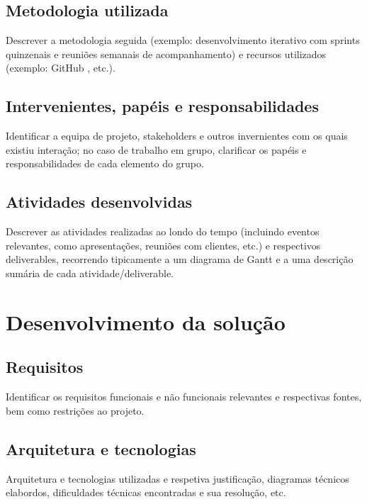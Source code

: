 \documentclass[10pt]{article}
\begin{document}
\subsection{Metodologia utilizada}

    Descrever a metodologia\cite{despa2014comparative} seguida (exemplo: desenvolvimento iterativo com sprints quinzenais e reuniões semanais de acompanhamento) e recursos utilizados (exemplo: GitHub \cite{github}, etc.).
	
	
\subsection{Intervenientes, papéis e responsabilidades}

Identificar a equipa de projeto, stakeholders e outros invernientes com os quais existiu interação; no caso de trabalho em grupo, clarificar os papéis e responsabilidades de cada elemento do grupo.

\subsection{Atividades desenvolvidas}

Descrever as atividades realizadas ao londo do tempo (incluindo eventos relevantes, como apresentações, reuniões com clientes, etc.) e respectivos deliverables, recorrendo tipicamente a um diagrama de Gantt\cite{gantt} e a uma descrição sumária de cada atividade/deliverable. 


\section{Desenvolvimento da solução}

\subsection{Requisitos}

Identificar os requisitos funcionais e não funcionais relevantes e respectivas fontes, bem como restrições ao projeto.

\subsection{Arquitetura e tecnologias}

Arquitetura e tecnologias utilizadas e respetiva justificação, diagramas técnicos elabordos, dificuldades técnicas encontradas e sua resolução, etc.
\end{document}
